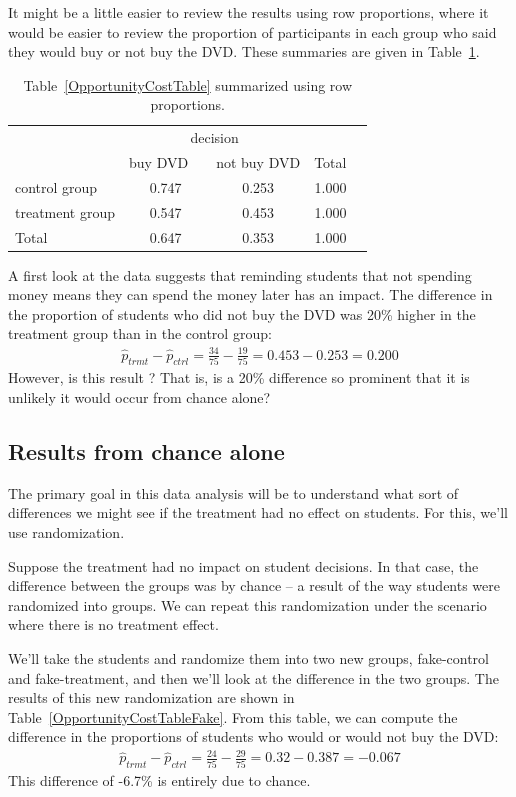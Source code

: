 It might be a little easier to review the results using row proportions, where it would be easier to review the proportion of participants in each group who said they would buy or not buy the DVD. These summaries are given in Table~\ref{OpportunityCostTableRowProp}.

\begin{table}[ht]
\centering
\begin{tabular}{l cc rr}
& \multicolumn{2}{c}{decision} \\
\cline{2-3}
				& {buy DVD}\ \  	& {not buy DVD} & Total & \hspace{3mm}  \\ 
\cline{1-4}
control group 		& 0.747	& 0.253	& 1.000 \\ 
treatment group 	& 0.547	& 0.453	& 1.000 \\ 
\cline{1-4}
Total				& 0.647	& 0.353	& 1.000
\end{tabular}
\caption{Table~\ref{OpportunityCostTable} summarized using row proportions.}
\label{OpportunityCostTableRowProp}
\end{table}

A first look at the data suggests that reminding students that not spending money means they can spend the money later has an impact. The difference in the proportion of students who did not buy the DVD was 20\% higher in the treatment group than in the control group:
\begin{align*}
\hat{p}_{trmt} - \hat{p}_{ctrl}
  = \frac{34}{75} - \frac{19}{75}
  = 0.453 - 0.253
  = 0.200
\end{align*}
However, is this result ? That is, is a 20\% difference so prominent that it is unlikely it would occur from chance alone?

\subsection{Results from chance alone}

The primary goal in this data analysis will be to understand what sort of differences we might see if the treatment had no effect on students. For this, we'll use randomization.

Suppose the treatment had no impact on student decisions. In that case, the difference between the groups was by chance -- a result of the way students were randomized into groups. We can repeat this randomization under the scenario where there is no treatment effect.

We'll take the students and randomize them into two new groups, fake-control and fake-treatment, and then we'll look at the difference in the two groups. The results of this new randomization are shown in Table~\ref{OpportunityCostTableFake}. From this table, we can compute the difference in the proportions of students who would or would not buy the DVD:
\begin{align*}
\hat{p}_{trmt} - \hat{p}_{ctrl}
  = \frac{24}{75} - \frac{29}{75}
  = 0.32 - 0.387
  = - 0.067
\end{align*}
This difference of -6.7\% is entirely due to chance.

